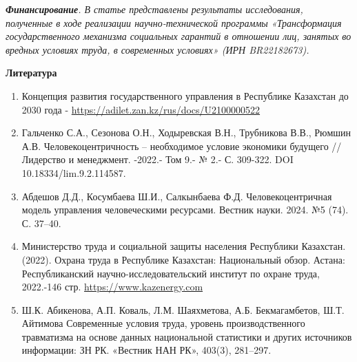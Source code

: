 \begin{multicols}{2}
\emph{{\bfseries Финансирование}. В статье представлены результаты
исследования, полученные в ходе реализации научно-технической программы
«Трансформация государственного механизма социальных гарантий в
отношении лиц, занятых во вредных условиях труда, в современных
условиях» (ИРН BR22182673).}


\end{multicols}
\begin{center}

{\bfseries Литература}
\end{center}
\begin{references}

\begin{enumerate}
\def\labelenumi{\arabic{enumi}.}
\item
  Концепция развития государственного управления в Республике Казахстан
  до 2030 года - \url{https://adilet.zan.kz/rus/docs/U2100000522}
\item
  Гальченко С.А., Сезонова О.Н., Ходыревская В.Н., Трубникова В.В.,
  Рюмшин А.В. Человекоцентричность -- необходимое условие экономики
  будущего // Лидерство и менеджмент. -2022.- Том 9.- № 2.- С. 309-322.
  DOI 10.18334/lim.9.2.114587.
\item
  Абдешов Д.Д., Косумбаева Ш.И., Салкынбаева Ф.Д. Человекоцентричная
  модель управления человеческими ресурсами. Вестник науки. 2024. №5
  (74). С. 37--40.
\item
  Министерство труда и социальной защиты населения Республики Казахстан.
  (2022). Охрана труда в Республике Казахстан: Национальный обзор.
  Астана: Республиканский научно-исследовательский институт по охране
  труда, 2022.-146 стр.
  \href{https://www.kazenergy.com/upload/document/development/ohrana_2023.pdf}{https://www.kazenergy.com}
\item
  Ш.К. Абикенова, А.П. Коваль, Л.М. Шаяхметова, А.Б. Бекмагамбетов, Ш.Т.
  Айтимова Современные условия труда, уровень производственного
  травматизма на основе данных национальной статистики и других
  источников информации: ЗН РК. «Вестник НАН РК», 403(3), 281--297.


\end{enumerate}
\end{references}
